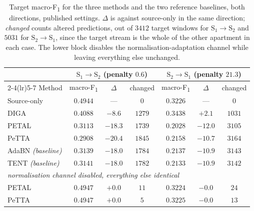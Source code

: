 \documentclass[a4paper,fleqn]{cas-dc}
\newcommand{\macf}{macro-F\textsubscript{1}}
\begin{document}
\begin{table}[t]
\centering
\caption{Target \macf{} for the three methods and the two reference baselines, both
directions, published settings. $\Delta$ is against source-only in the same direction;
\emph{changed} counts altered predictions, out of $3412$ target windows for
$\text{S}_1\!\to\!\text{S}_2$ and $5031$ for $\text{S}_2\!\to\!\text{S}_1$, since the
target stream is the whole of the other apartment in each case. The lower block disables
the normalisation-adaptation channel while leaving everything else unchanged.}
\label{tab:harmethods}
\small
\begin{tabular}{lcccccc}
\toprule
 & \multicolumn{3}{c}{$\text{S}_1\!\to\!\text{S}_2$ (penalty $0.6$)} & \multicolumn{3}{c}{$\text{S}_2\!\to\!\text{S}_1$ (penalty $21.3$)} \\
\cmidrule(lr){2-4}\cmidrule(lr){5-7}
Method & \macf & $\Delta$ & changed & \macf & $\Delta$ & changed \\
\midrule
Source-only & $0.4944$ & --- & $0$ & $0.3226$ & --- & $0$ \\
\addlinespace[2pt]
DIGA  & $0.4088$ & $-8.6$  & $1279$ & $0.3438$ & $+2.1$ & $1031$ \\
PETAL & $0.3113$ & $-18.3$ & $1739$ & $0.2028$ & $-12.0$ & $3105$ \\
PeTTA & $0.2908$ & $-20.4$ & $1845$ & $0.2158$ & $-10.7$ & $3164$ \\
\addlinespace[2pt]
AdaBN \emph{(baseline)} & $0.3139$ & $-18.0$ & $1784$ & $0.2137$ & $-10.9$ & $3143$ \\
TENT \emph{(baseline)}  & $0.3141$ & $-18.0$ & $1782$ & $0.2133$ & $-10.9$ & $3142$ \\
\midrule
\multicolumn{7}{l}{\emph{normalisation channel disabled, everything else identical}} \\
\addlinespace[2pt]
PETAL & $0.4947$ & $+0.0$ & $11$ & $0.3224$ & $-0.0$ & $24$ \\
PeTTA & $0.4947$ & $+0.0$ & $5$  & $0.3225$ & $-0.0$ & $13$ \\
\bottomrule
\end{tabular}
\end{table}
\end{document}
